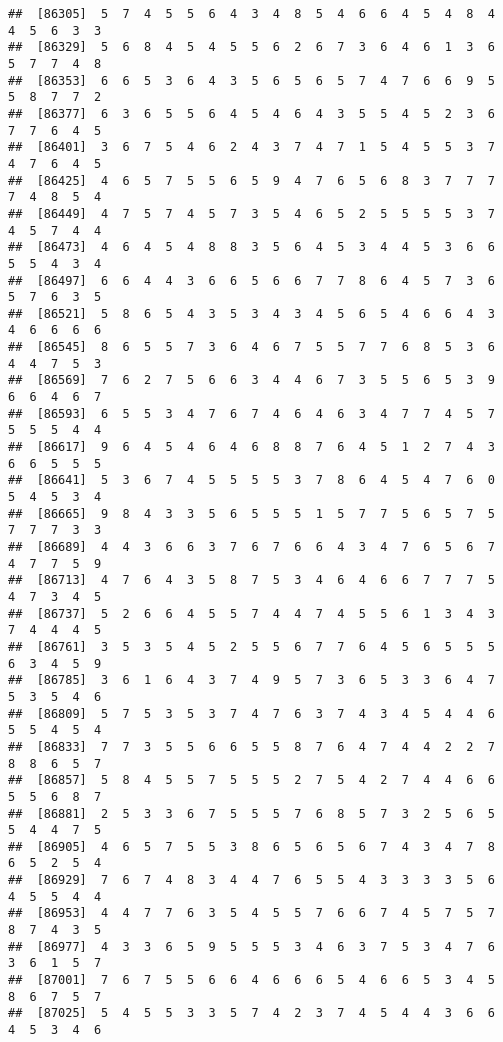 \documentclass[
]{book}
\begin{document}
\begin{verbatim}
##  [86305]  5  7  4  5  5  6  4  3  4  8  5  4  6  6  4  5  4  8  4  4  5  6  3  3
##  [86329]  5  6  8  4  5  4  5  5  6  2  6  7  3  6  4  6  1  3  6  5  7  7  4  8
##  [86353]  6  6  5  3  6  4  3  5  6  5  6  5  7  4  7  6  6  9  5  5  8  7  7  2
##  [86377]  6  3  6  5  5  6  4  5  4  6  4  3  5  5  4  5  2  3  6  7  7  6  4  5
##  [86401]  3  6  7  5  4  6  2  4  3  7  4  7  1  5  4  5  5  3  7  4  7  6  4  5
##  [86425]  4  6  5  7  5  5  6  5  9  4  7  6  5  6  8  3  7  7  7  7  4  8  5  4
##  [86449]  4  7  5  7  4  5  7  3  5  4  6  5  2  5  5  5  5  3  7  4  5  7  4  4
##  [86473]  4  6  4  5  4  8  8  3  5  6  4  5  3  4  4  5  3  6  6  5  5  4  3  4
##  [86497]  6  6  4  4  3  6  6  5  6  6  7  7  8  6  4  5  7  3  6  5  7  6  3  5
##  [86521]  5  8  6  5  4  3  5  3  4  3  4  5  6  5  4  6  6  4  3  4  6  6  6  6
##  [86545]  8  6  5  5  7  3  6  4  6  7  5  5  7  7  6  8  5  3  6  4  4  7  5  3
##  [86569]  7  6  2  7  5  6  6  3  4  4  6  7  3  5  5  6  5  3  9  6  6  4  6  7
##  [86593]  6  5  5  3  4  7  6  7  4  6  4  6  3  4  7  7  4  5  7  5  5  5  4  4
##  [86617]  9  6  4  5  4  6  4  6  8  8  7  6  4  5  1  2  7  4  3  6  6  5  5  5
##  [86641]  5  3  6  7  4  5  5  5  5  3  7  8  6  4  5  4  7  6  0  5  4  5  3  4
##  [86665]  9  8  4  3  3  5  6  5  5  5  1  5  7  7  5  6  5  7  5  7  7  7  3  3
##  [86689]  4  4  3  6  6  3  7  6  7  6  6  4  3  4  7  6  5  6  7  4  7  7  5  9
##  [86713]  4  7  6  4  3  5  8  7  5  3  4  6  4  6  6  7  7  7  5  4  7  3  4  5
##  [86737]  5  2  6  6  4  5  5  7  4  4  7  4  5  5  6  1  3  4  3  7  4  4  4  5
##  [86761]  3  5  3  5  4  5  2  5  5  6  7  7  6  4  5  6  5  5  5  6  3  4  5  9
##  [86785]  3  6  1  6  4  3  7  4  9  5  7  3  6  5  3  3  6  4  7  5  3  5  4  6
##  [86809]  5  7  5  3  5  3  7  4  7  6  3  7  4  3  4  5  4  4  6  5  5  4  5  4
##  [86833]  7  7  3  5  5  6  6  5  5  8  7  6  4  7  4  4  2  2  7  8  8  6  5  7
##  [86857]  5  8  4  5  5  7  5  5  5  2  7  5  4  2  7  4  4  6  6  5  5  6  8  7
##  [86881]  2  5  3  3  6  7  5  5  5  7  6  8  5  7  3  2  5  6  5  5  4  4  7  5
##  [86905]  4  6  5  7  5  5  3  8  6  5  6  5  6  7  4  3  4  7  8  6  5  2  5  4
##  [86929]  7  6  7  4  8  3  4  4  7  6  5  5  4  3  3  3  3  5  6  4  5  5  4  4
##  [86953]  4  4  7  7  6  3  5  4  5  5  7  6  6  7  4  5  7  5  7  8  7  4  3  5
##  [86977]  4  3  3  6  5  9  5  5  5  3  4  6  3  7  5  3  4  7  6  3  6  1  5  7
##  [87001]  7  6  7  5  5  6  6  4  6  6  6  5  4  6  6  5  3  4  5  8  6  7  5  7
##  [87025]  5  4  5  5  3  3  5  7  4  2  3  7  4  5  4  4  3  6  6  4  5  3  4  6

\end{verbatim}
\end{document}
